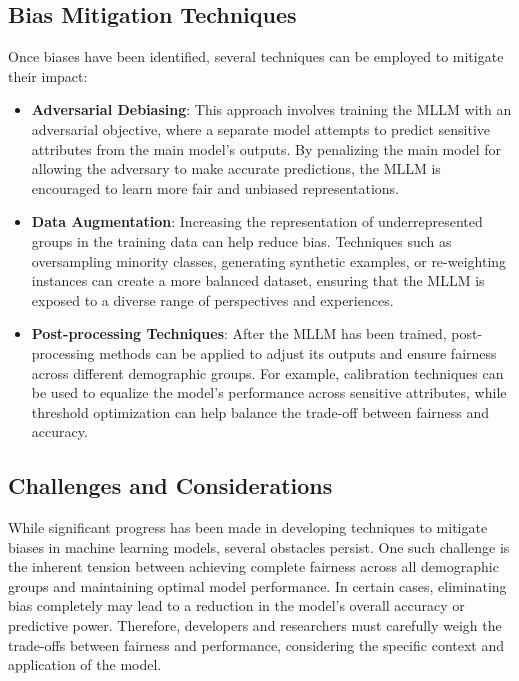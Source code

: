 \subsection{Bias Mitigation Techniques}

Once biases have been identified, several techniques can be employed to mitigate their impact:

\begin{itemize}
    \item \textbf{Adversarial Debiasing}: This approach involves training the MLLM with an adversarial objective, where a separate model attempts to predict sensitive attributes from the main model's outputs. By penalizing the main model for allowing the adversary to make accurate predictions, the MLLM is encouraged to learn more fair and unbiased representations.
    
    \item \textbf{Data Augmentation}: Increasing the representation of underrepresented groups in the training data can help reduce bias. Techniques such as oversampling minority classes, generating synthetic examples, or re-weighting instances can create a more balanced dataset, ensuring that the MLLM is exposed to a diverse range of perspectives and experiences.
    
    \item \textbf{Post-processing Techniques}: After the MLLM has been trained, post-processing methods can be applied to adjust its outputs and ensure fairness across different demographic groups. For example, calibration techniques can be used to equalize the model's performance across sensitive attributes, while threshold optimization can help balance the trade-off between fairness and accuracy.
\end{itemize}

\subsection{Challenges and Considerations}

While significant progress has been made in developing techniques to mitigate biases in machine learning models, several obstacles persist. One such challenge is the inherent tension between achieving complete fairness across all demographic groups and maintaining optimal model performance. In certain cases, eliminating bias completely may lead to a reduction in the model's overall accuracy or predictive power. Therefore, developers and researchers must carefully weigh the trade-offs between fairness and performance, considering the specific context and application of the model.

